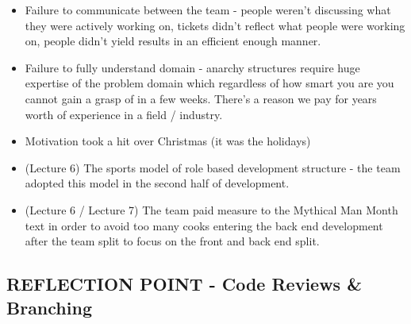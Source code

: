 \documentclass{l3proj}
\begin{document}
\begin{itemize}
\item Failure to communicate between the team - people weren’t discussing what they were actively working on, tickets didn’t reflect what people were working on, people didn’t yield results in an efficient enough manner.
\item Failure to fully understand domain - anarchy structures require huge expertise of the problem domain which regardless of how smart you are you cannot gain a grasp of in a few weeks. There’s a reason we pay for years worth of experience in a field / industry.
\item Motivation took a hit over Christmas (it was the holidays)
\item (Lecture 6) The sports model of role based development structure - the team adopted this model in the second half of development.
\item (Lecture 6 / Lecture 7) The team paid measure to the Mythical Man Month text in order to avoid too many cooks entering the back end development after the team split to focus on the front and back end split.
\end{itemize}


\subsection{REFLECTION POINT - Code Reviews \& Branching}
\label{sec:codereviewbranch}



\end{document}
